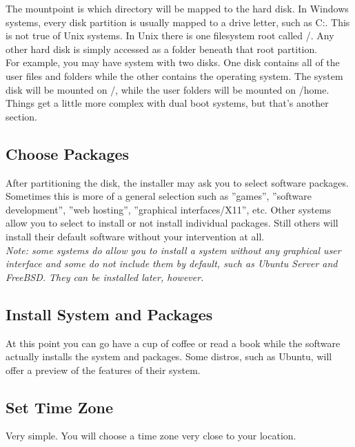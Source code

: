 The mountpoint is which directory will be mapped to the hard disk.  In Windows systems, every disk partition is usually mapped to a drive letter, such as C:.  This is not true of Unix systems.  In Unix there is one filesystem root called /.  Any other hard disk is simply accessed as a folder beneath that root partition.\\

For example, you may have system with two disks.  One disk contains all of the user files and folders while the other contains the operating system.  The system disk will be mounted on /, while the user folders will be mounted on /home.\\

Things get a little more complex with dual boot systems, but that's another section.

\subsection{Choose Packages}

After partitioning the disk, the installer may ask you to select software packages.  Sometimes this is more of a general selection such as ''games'', ''software development'', ''web hosting'', ''graphical interfaces/X11'', etc.  Other systems allow you to select to install or not install individual packages.  Still others will install their default software without your intervention at all.\\

\textit{Note: some systems do allow you to install a system without any graphical user interface and some do not include them by default, such as Ubuntu Server and FreeBSD.  They can be installed later, however.}

\subsection{Install System and Packages}

At this point you can go have a cup of coffee or read a book while the software actually installs the system and packages.  Some distros, such as Ubuntu, will offer a preview of the features of their system.

\subsection{Set Time Zone}

Very simple.  You will choose a time zone very close to your location.

